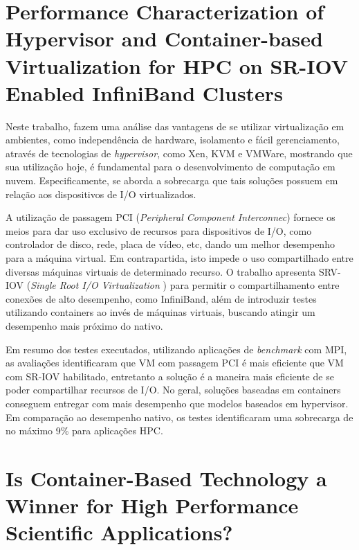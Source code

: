 \documentclass[twoside,english,brazilian]{UNISINOSartigo}
\begin{document}
\section{Performance Characterization of Hypervisor and Container-based Virtualization for HPC on SR-IOV Enabled InfiniBand Clusters}
\label{trabdocker4}

Neste trabalho,  fazem uma análise das vantagens de se utilizar virtualização em ambientes, como independência de hardware, isolamento e fácil gerenciamento, através de tecnologias de \textit{hypervisor}, como Xen, KVM e VMWare, mostrando que sua utilização hoje, é fundamental para o desenvolvimento de computação em nuvem. Especificamente, se aborda a sobrecarga que tais soluções possuem em relação aos dispositivos de I/O virtualizados.

A utilização de passagem PCI (\textit{Peripheral Component Interconnec}) fornece os meios para dar uso exclusivo de recursos para dispositivos de I/O, como controlador de disco, rede, placa de vídeo, etc, dando um melhor desempenho para a máquina virtual. Em contrapartida, isto impede o uso compartilhado entre diversas máquinas virtuais de determinado recurso. O trabalho apresenta SRV-IOV (\textit{Single Root I/O Virtualization }) para permitir o compartilhamento entre conexões de alto desempenho, como InfiniBand, além de introduzir testes utilizando containers ao invés de máquinas virtuais, buscando atingir um desempenho mais próximo do nativo.

Em resumo dos testes executados, utilizando aplicações de \textit{benchmark} com MPI, as avaliações identificaram que VM com passagem PCI é mais eficiente que VM com SR-IOV habilitado, entretanto a solução é a maneira mais eficiente de se poder compartilhar recursos de I/O. No geral, soluções baseadas em containers conseguem entregar com mais desempenho que modelos baseados em hypervisor. Em comparação ao desempenho nativo, os testes identificaram uma sobrecarga de no máximo 9\% para aplicações HPC.

\section{Is Container-Based Technology a Winner for High Performance Scientific Applications?}
\label{trabdocker5}
\end{document}
